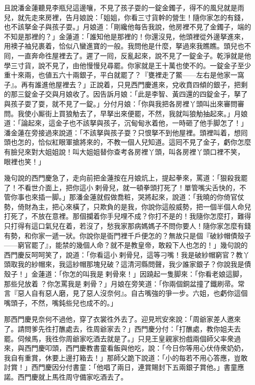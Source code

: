 且說潘金蓮聽見李瓶兒這邊嚷，不見了孩子耍的一錠金鐲子，得不的風兒就是雨兒，就先走來房裡，告月娘說：「姐姐，你看三寸貨幹的營生！隨你家怎的有錢，也不該拏金子與孩子耍。」月娘道：「剛纔他每告我說，他房裡不見了金鐲子，端的不知是那裡的？」金蓮道：「誰知他是那裡的！你還沒見，他頭裡從外邊拏進來，用襖子袖兒裹着，恰似八蠻進寶的一般。{}我問他是什麼，拏過來我瞧瞧。頭兒也不囘，一直奔命徃屋裡去了。遲了一囘，反亂起來，說不見了一錠金子。乾淨就是他學三寸貨，說不見了，由他慢慢兒尋罷。你家就是王十萬也使不的。一錠金子至少重十來兩，也値五六十兩銀子，平白就罷了？『甕裡走了鱉——左右是他家一窩子』。再有誰進他屋裡去？」正說着，只見西門慶進來，兌收賁四傾的銀子，把剩的那三錠金子交與月娘收了。因告訴月娘：「此是李智、黃四還的四錠金子，拏了與孩子耍了耍，就不見了一錠。」分付月娘：「你與我把各房裡丫頭叫出來審問審問。我使小厮街上買狼觔去了，早拏出來便罷，不然，我就叫狼觔抽起來。」{}月娘道：「論起來，這金子也不該拏與孩子，沉甸甸氷着他，一時砸了他手脚怎了！」潘金蓮在旁接過來說道：{}「不該拏與孩子耍？只恨拏不到他屋裡。頭裡叫着，想囘頭也怎的，恰似紅眼軍搶將來的，不教一個人兒知道。這囘不見了金子，虧你怎麼有臉兒來對大姐姐說！叫大姐姐替你查考各房裡丫頭，叫各房裡丫頭口裡不笑，𣭈眼裡也笑！」

幾句說的西門慶急了，走向前把金蓮按在月娘炕上，提起拳來，罵道：「狠殺我罷了！不看世介面上，把你這小𢱉剌骨兒，就一頓拳頭打死了！單管嘴尖舌快的，不管你事也來插一脚。」那潘金蓮就假做喬粧，哭將起來，說道：「我曉的你倚官仗勢，倚財為主，把心來橫了，只欺負的是我，你說你這般威勢，把一個半個人命兒打死了，不放在意裡。那個攔着你手兒哩不成？你打不是的！我隨你怎麼打，難得只打得有這口氣兒在着，若沒了，愁我家那病媽媽子不問你要人！隨你家怎麼有錢有勢，和你家一遞一狀。你說你是衙門裡千戶便怎的？無故只是個『破紗帽債殼子——窮官罷了』，能禁的幾個人命？就不是教皇帝，敢殺下人也怎的！」{}幾句說的西門慶反呵呵笑了，說道：「你看這小𢱉剌骨兒，這等刁嘴！我是破紗帽窮官？教丫頭取我的紗帽來，我這紗帽那塊兒破？這清河縣問聲，我少誰家銀子？你說我是債殼子！」金蓮道：「你怎的叫我是𢱉剌骨來！」因蹺起一隻脚來：「你看老娘這脚，那些兒放着𢱉？你怎罵我是𢱉剌骨？」月娘在旁笑道：「你兩個銅盆撞了鐵刷帚。常言『惡人自有惡人磨，見了惡人沒奈何』。自古嘴強的爭一步。六姐，也虧你這個嘴頭子，不然，嘴鈍些兒也成不的。」

那西門慶見奈何不過他，穿了衣裳徃外去了。迎見玳安來說：「周爺家差人邀來了。請問爹先徃打醮處去，徃周爺家去？」西門慶分付：「打醮處，教你姐夫去罷。伺候馬，我徃你周爺家吃酒去就是了。」只見王皇親家扮戲兩個師父率衆過來，與西門慶叩頭，西門慶教書童看飯與他吃，說：「今日你等用心伏侍衆奶奶，我自有重賞，休要上邊打箱去！」那師父跪下說道：「小的每若不用心答應，豈敢討賞！」西門慶因分付書童：「他唱了兩日，連賞賜封下五兩銀子賞他。」書童應諾。西門慶就上馬徃周守備家吃酒去了。

